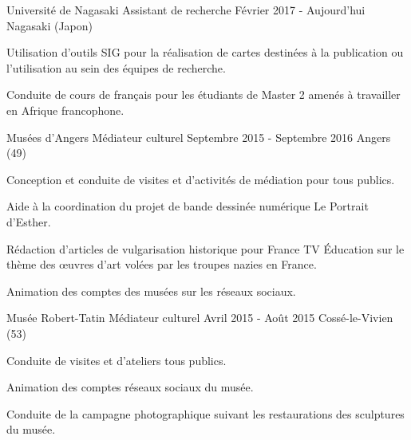 

\begin{cventries}

  \cventry
    {Université de Nagasaki} %
    {Assistant de recherche} %
    {Février 2017 - Aujourd'hui} %
    {Nagasaki (Japon)} %
    {
      \begin{cvitems} %
        \item {Utilisation d'outils SIG pour la réalisation de cartes destinées à la publication ou l'utilisation au sein des équipes de recherche.}
        \item {Conduite de cours de français pour les étudiants de Master 2 amenés à travailler en Afrique francophone.}
      \end{cvitems}
    }

  \cventry
    {Musées d'Angers} %
    {Médiateur culturel} %
    {Septembre 2015 - Septembre 2016} %
    {Angers (49)} %
    {
      \begin{cvitems} %
        \item {Conception et conduite de visites et d'activités de médiation pour tous publics.}
        \item {Aide à la coordination du projet de bande dessinée numérique Le Portrait d'Esther.}
        \item {Rédaction d'articles de vulgarisation historique pour France TV Éducation sur le thème des œuvres d'art volées par les troupes nazies en France. }
        \item {Animation des comptes des musées sur les réseaux sociaux.}
      \end{cvitems}
    }

  \cventry
    {Musée Robert-Tatin} %
    {Médiateur culturel} %
    {Avril 2015 - Août 2015} %
    {Cossé-le-Vivien (53)} %
    {
      \begin{cvitems} %
        \item {Conduite de visites et d’ateliers tous publics.}
        \item {Animation des comptes réseaux sociaux du musée.}
        \item {Conduite de la campagne photographique suivant les restaurations des sculptures du musée.}
      \end{cvitems}
    }


\end{cventries}
